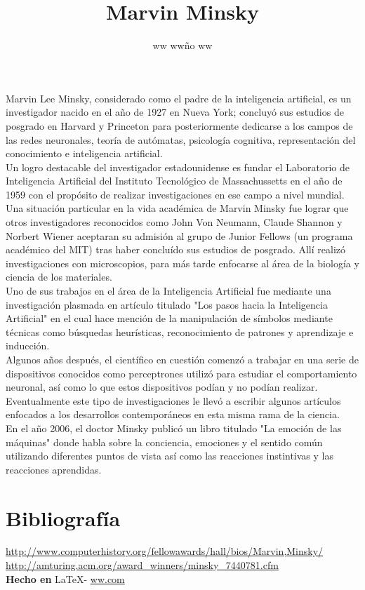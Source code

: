\documentclass{article}
\title{Marvin Minsky}
\author{ww ww\~no ww}
\date{} %
\begin{document}
	\maketitle
	\normalsize{
Marvin Lee Minsky, considerado como el padre de la inteligencia artificial, es un investigador nacido en el año de 1927 en Nueva York; concluyó sus estudios de posgrado en Harvard y Princeton para posteriormente dedicarse a los campos de las redes neuronales, teoría de autómatas, psicología cognitiva, representación del conocimiento e inteligencia artificial.
\\

Un logro destacable del investigador estadounidense es fundar el Laboratorio de Inteligencia Artificial del Instituto Tecnológico de Massachussetts en el año de 1959 con el propósito de realizar investigaciones en ese campo a nivel mundial.
\\

Una situación particular en la vida académica de Marvin Minsky fue lograr que otros investigadores reconocidos como John Von Neumann, Claude Shannon y Norbert Wiener aceptaran su admisión al grupo de Junior Fellows (un programa académico del MIT) tras haber concluído sus estudios de posgrado. Allí realizó investigaciones con microscopios, para más tarde enfocarse al área de la biología y ciencia de los materiales.
\\

Uno de sus trabajos en el área de la Inteligencia Artificial fue mediante una investigación plasmada en artículo titulado "Los pasos hacia la Inteligencia Artificial" en el cual hace mención de la manipulación de símbolos mediante técnicas como búsquedas heurísticas, reconocimiento de patrones y aprendizaje e inducción.
\\

Algunos años después, el científico en cuestión comenzó a trabajar en una serie de dispositivos conocidos como perceptrones utilizó para estudiar el comportamiento neuronal, así como lo que estos dispositivos podían y no podían realizar. Eventualmente este tipo de investigaciones le llevó a escribir algunos artículos enfocados a los desarrollos contemporáneos en esta misma rama de la ciencia.
\\

En el año 2006, el doctor Minsky publicó un libro titulado "La emoción de las máquinas" donde habla sobre la conciencia, emociones y el sentido común utilizando diferentes puntos de vista así como las reacciones instintivas y las reacciones aprendidas.

}

\vspace{1cm}

\section*{Bibliograf\'ia}

\noindent \url{http://www.computerhistory.org/fellowawards/hall/bios/Marvin,Minsky/}
\\
\noindent \url{http://amturing.acm.org/award_winners/minsky_7440781.cfm}
\\

\large{\hfill \textbf{Hecho en } \LaTeX - \url{ww.com}}
\end{document}
